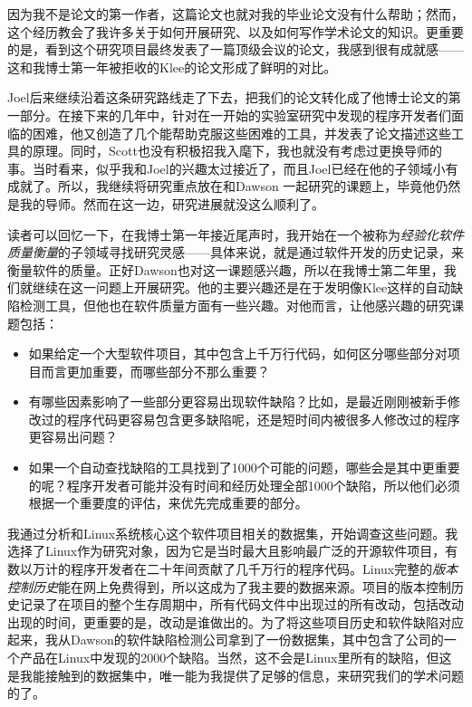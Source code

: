 \documentclass[letter,12pt]{book}
\begin{document}
\begin{CJK}{UTF8}{gbsn}
因为我不是论文的第一作者，这篇论文也就对我的毕业论文没有什么帮助；然而，这个经历教会了我许多关于如何开展研究、以及如何写作学术论文的知识。更重要的是，看到这个研究项目最终发表了一篇顶级会议的论文，我感到很有成就感——这和我博士第一年被拒收的Klee的论文形成了鲜明的对比。

Joel后来继续沿着这条研究路线走了下去，把我们的论文转化成了他博士论文的第一部分。在接下来的几年中，针对在一开始的实验室研究中发现的程序开发者们面临的困难，他又创造了几个能帮助克服这些困难的工具，并发表了论文描述这些工具的原理。同时，Scott也没有积极招我入麾下，我也就没有考虑过更换导师的事。当时看来，似乎我和Joel的兴趣太过接近了，而且Joel已经在他的子领域小有成就了。所以，我继续将研究重点放在和Dawson 一起研究的课题上，毕竟他仍然是我的导师。然而在这一边，研究进展就没这么顺利了。

\breakline

读者可以回忆一下，在我博士第一年接近尾声时，我开始在一个被称为\emph{经验化软件质量衡量}的子领域寻找研究灵感——具体来说，就是通过软件开发的历史记录，来衡量软件的质量。正好Dawson也对这一课题感兴趣，所以在我博士第二年里，我们就继续在这一问题上开展研究。他的主要兴趣还是在于发明像Klee这样的自动缺陷检测工具，但他也在软件质量方面有一些兴趣。对他而言，让他感兴趣的研究课题包括：

\begin{itemize}
\item 如果给定一个大型软件项目，其中包含上千万行代码，如何区分哪些部分对项目而言更加重要，而哪些部分不那么重要？
\item 有哪些因素影响了一些部分更容易出现软件缺陷？比如，是最近刚刚被新手修改过的程序代码更容易包含更多缺陷呢，还是短时间内被很多人修改过的程序更容易出问题？
\item 如果一个自动查找缺陷的工具找到了1000个可能的问题，哪些会是其中更重要的呢？程序开发者可能并没有时间和经历处理全部1000个缺陷，所以他们必须根据一个重要度的评估，来优先完成重要的部分。
\end{itemize}

我通过分析和Linux系统核心这个软件项目相关的数据集，开始调查这些问题。我选择了Linux作为研究对象，因为它是当时最大且影响最广泛的开源软件项目，有数以万计的程序开发者在二十年间贡献了几千万行的程序代码。Linux完整的\emph{版本控制历史}能在网上免费得到，所以这成为了我主要的数据来源。项目的版本控制历史记录了在项目的整个生存周期中，所有代码文件中出现过的所有改动，包括改动出现的时间，更重要的是，改动是谁做出的。为了将这些项目历史和软件缺陷对应起来，我从Dawson的软件缺陷检测公司拿到了一份数据集，其中包含了公司的一个产品在Linux中发现的2000个缺陷。当然，这不会是Linux里所有的缺陷，但这是我能接触到的数据集中，唯一能为我提供了足够的信息，来研究我们的学术问题的了。


\end{CJK}
\end{document}
